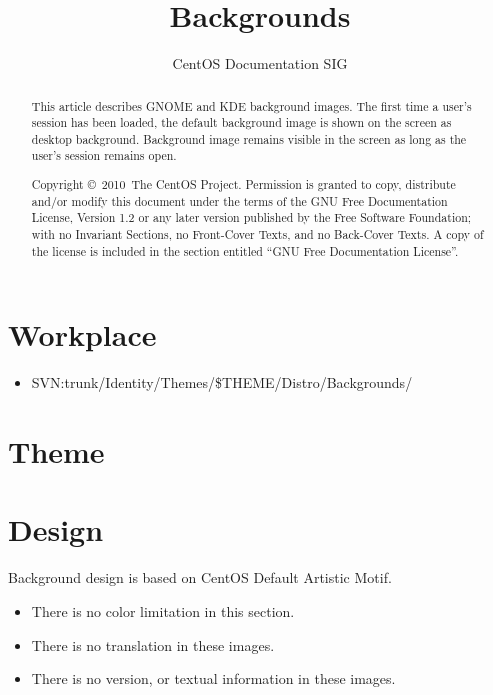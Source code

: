 \documentclass{article}
\title{Backgrounds}
\author{CentOS Documentation SIG}
\begin{document}
\maketitle

\begin{abstract}
This article describes GNOME and KDE background images.  The first
time a user's session has been loaded, the default background image is
shown on the screen as desktop background. Background image remains
visible in the screen as long as the user's session remains open. 

Copyright \copyright\ 2010\ The CentOS Project. Permission is
granted to copy, distribute and/or modify this document under the
terms of the GNU Free Documentation License, Version 1.2 or any later
version published by the Free Software Foundation; with no Invariant
Sections, no Front-Cover Texts, and no Back-Cover Texts. A copy of the
license is included in the section entitled ``GNU Free Documentation
License''.  
\end{abstract}

\tableofcontents

\section{Workplace}

\begin{itemize}
\item SVN:trunk/Identity/Themes/\$THEME/Distro/Backgrounds/
\end{itemize}

\section{Theme}



\section{Design}

Background design is based on CentOS Default Artistic Motif.

\begin{itemize}
\item There is no color limitation in this section.
\item There is no translation in these images.
\item There is no version, or textual information in these images.
\end{itemize}
\end{document}
